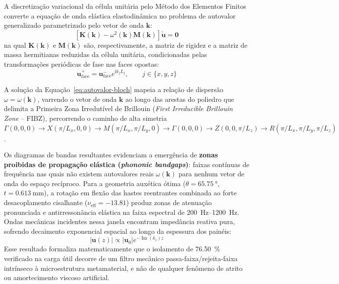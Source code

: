 A discretização variacional da célula unitária pelo Método dos Elementos Finitos converte a equação de onda elástica elastodinâmica no problema de autovalor generalizado parametrizado pelo vetor de onda $\mathbf{k}$:
\begin{equation}
  \left[ \mathbf{K}(\mathbf{k}) - \omega^2(\mathbf{k}) \mathbf{M}(\mathbf{k}) \right] \tilde{\mathbf{u}} = \mathbf{0}
  \label{eq:autovalor-bloch}
\end{equation}
na qual $\mathbf{K}(\mathbf{k})$ e $\mathbf{M}(\mathbf{k})$ são, respectivamente, a matriz de rigidez e a matriz de massa hermitianas reduzidas da célula unitária, condicionadas pelas transformações periódicas de fase nas faces opostas:
\begin{equation}
  \mathbf{u}_{\text{face}}^{+} = \mathbf{u}_{\text{face}}^{-} e^{\mathrm{i} k_j L_j}, \qquad j \in \{x, y, z\}
  \label{eq:pbc-fase}
\end{equation}

A solução da Equação~\eqref{eq:autovalor-bloch} mapeia a relação de dispersão $\omega = \omega(\mathbf{k})$, varrendo o vetor de onda $\mathbf{k}$ ao longo das arestas do poliedro que delimita a Primeira Zona Irredutível de Brillouin (\textit{First Irreducible Brillouin Zone} -- FIBZ), percorrendo o caminho de alta simetria $\Gamma (0,0,0) \to X (\pi/L_x, 0, 0) \to M (\pi/L_x, \pi/L_y, 0) \to \Gamma (0,0,0) \to Z (0, 0, \pi/L_z) \to R (\pi/L_x, \pi/L_y, \pi/L_z)$.

Os diagramas de bandas resultantes evidenciam a emergência de \textbf{zonas proibidas de propagação elástica (\textit{phononic bandgaps})}: faixas contínuas de frequência nas quais não existem autovalores reais $\omega(\mathbf{k})$ para nenhum vetor de onda do espaço recíproco. Para a geometria auxética ótima ($\theta = \SI{65.75}{\degree}$, $t = \SI{0.613}{\milli\metre}$), a rotação em flexão das hastes reentrantes combinada ao forte desacoplamento cisalhante ($\nu_{\text{eff}} = \num{-13.81}$) produz zonas de atenuação pronunciada e antirressonância elástica na faixa espectral de \SIrange{200}{1200}{\hertz}. Ondas mecânicas incidentes nessa janela encontram impedância reativa pura, sofrendo decaimento exponencial espacial ao longo da espessura dos painéis:
\begin{equation}
  |\mathbf{u}(z)| \propto |\mathbf{u}_0| e^{-\operatorname{Im}(k_z) z}
  \label{eq:atenuacao-exp}
\end{equation}
Esse resultado formaliza matematicamente que o isolamento de \SI{76.50}{\percent} verificado na carga útil decorre de um filtro mecânico passa-faixa/rejeita-faixa intrínseco à microestrutura metamaterial, e não de qualquer fenômeno de atrito ou amortecimento viscoso artificial.

